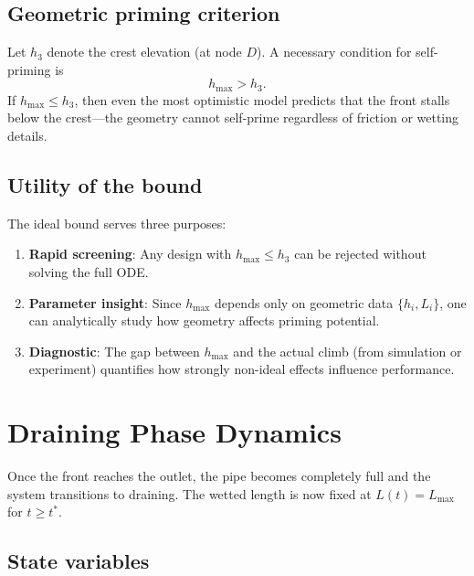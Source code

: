\documentclass[11pt]{article}
\theoremstyle{definition}
\begin{document}
\subsection{Geometric priming criterion}

Let $h_3$ denote the crest elevation (at node $D$). A necessary condition for self-priming is
\begin{equation}
  \boxed{h_{\max} > h_3.}
  \label{eq:priming-criterion}
\end{equation}
If $h_{\max} \le h_3$, then even the most optimistic model predicts that the front stalls 
below the crest---the geometry cannot self-prime regardless of friction or wetting details.

\subsection{Utility of the bound}

The ideal bound serves three purposes:
\begin{enumerate}[nosep]
  \item \textbf{Rapid screening}: Any design with $h_{\max} \le h_3$ can be rejected without 
        solving the full ODE.
  \item \textbf{Parameter insight}: Since $h_{\max}$ depends only on geometric data 
        $\{h_i, L_i\}$, one can analytically study how geometry affects priming potential.
  \item \textbf{Diagnostic}: The gap between $h_{\max}$ and the actual climb (from 
        simulation or experiment) quantifies how strongly non-ideal effects influence 
        performance.
\end{enumerate}

\section{Draining Phase Dynamics}
\label{sec:draining}

Once the front reaches the outlet, the pipe becomes completely full and the system 
transitions to draining. The wetted length is now fixed at $L(t) = L_{\max}$ for $t \ge t^*$.

\subsection{State variables}
\end{document}
